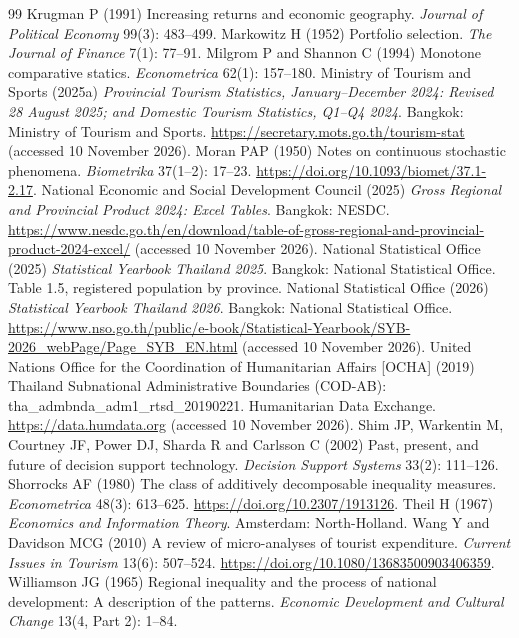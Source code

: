 \documentclass[11pt,a4paper]{article}
\theoremstyle{plain}\newtheorem{proposition}{Proposition}
\theoremstyle{definition}\newtheorem{definition}{Definition}
\begin{document}
\begin{thebibliography}{99}
 Krugman P (1991) Increasing returns and economic geography. \emph{Journal of Political Economy} 99(3): 483--499.
 Markowitz H (1952) Portfolio selection. \emph{The Journal of Finance} 7(1): 77--91.
 Milgrom P and Shannon C (1994) Monotone comparative statics. \emph{Econometrica} 62(1): 157--180.
 Ministry of Tourism and Sports (2025a) \emph{Provincial Tourism Statistics, January--December 2024: Revised 28 August 2025; and Domestic Tourism Statistics, Q1--Q4 2024}. Bangkok: Ministry of Tourism and Sports. \url{https://secretary.mots.go.th/tourism-stat} (accessed 10 November 2026).
 Moran PAP (1950) Notes on continuous stochastic phenomena. \emph{Biometrika} 37(1--2): 17--23. \url{https://doi.org/10.1093/biomet/37.1-2.17}.
 National Economic and Social Development Council (2025) \emph{Gross Regional and Provincial Product 2024: Excel Tables}. Bangkok: NESDC. \url{https://www.nesdc.go.th/en/download/table-of-gross-regional-and-provincial-product-2024-excel/} (accessed 10 November 2026).
 National Statistical Office (2025) \emph{Statistical Yearbook Thailand 2025}. Bangkok: National Statistical Office. Table 1.5, registered population by province.
 National Statistical Office (2026) \emph{Statistical Yearbook Thailand 2026}. Bangkok: National Statistical Office. \url{https://www.nso.go.th/public/e-book/Statistical-Yearbook/SYB-2026_webPage/Page_SYB_EN.html} (accessed 10 November 2026).
 United Nations Office for the Coordination of Humanitarian Affairs [OCHA] (2019) Thailand Subnational Administrative Boundaries (COD-AB): tha\_admbnda\_adm1\_rtsd\_20190221. Humanitarian Data Exchange. \url{https://data.humdata.org} (accessed 10 November 2026).
 Shim JP, Warkentin M, Courtney JF, Power DJ, Sharda R and Carlsson C (2002) Past, present, and future of decision support technology. \emph{Decision Support Systems} 33(2): 111--126.
 Shorrocks AF (1980) The class of additively decomposable inequality measures. \emph{Econometrica} 48(3): 613--625. \url{https://doi.org/10.2307/1913126}.
 Theil H (1967) \emph{Economics and Information Theory}. Amsterdam: North-Holland.
 Wang Y and Davidson MCG (2010) A review of micro-analyses of tourist expenditure. \emph{Current Issues in Tourism} 13(6): 507--524. \url{https://doi.org/10.1080/13683500903406359}.
 Williamson JG (1965) Regional inequality and the process of national development: A description of the patterns. \emph{Economic Development and Cultural Change} 13(4, Part 2): 1--84.
\end{thebibliography}
\end{document}

